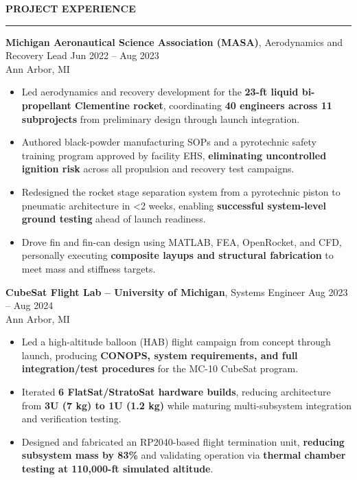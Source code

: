\documentclass[10pt]{article}
\newcommand{\ressection}[1]{
  \vspace{0.12em}
  {\large\bfseries #1}\par
  \vspace{0.05em}\hrule\vspace{0.12em}
}
\begin{document}
\ressection{PROJECT EXPERIENCE}

{\bfseries Michigan Aeronautical Science Association (MASA)}, Aerodynamics and Recovery Lead \hfill Jun 2022 -- Aug 2023 \\
Ann Arbor, MI
\begin{itemize}
  \item Led aerodynamics and recovery development for the \textbf{23-ft liquid bi-propellant Clementine rocket}, coordinating \textbf{40 engineers across 11 subprojects} from preliminary design through launch integration.
  \item Authored black-powder manufacturing SOPs and a pyrotechnic safety training program approved by facility EHS, \textbf{eliminating uncontrolled ignition risk} across all propulsion and recovery test campaigns.
  \item Redesigned the rocket stage separation system from a pyrotechnic piston to pneumatic architecture in <2 weeks, enabling \textbf{successful system-level ground testing} ahead of launch readiness.
  \item Drove fin and fin-can design using MATLAB, FEA, OpenRocket, and CFD, personally executing \textbf{composite layups and structural fabrication} to meet mass and stiffness targets.
\end{itemize}

{\bfseries CubeSat Flight Lab -- University of Michigan}, Systems Engineer \hfill Aug 2023 -- Aug 2024 \\
Ann Arbor, MI
\begin{itemize}
  \item Led a high-altitude balloon (HAB) flight campaign from concept through launch, producing \textbf{CONOPS, system requirements, and full integration/test procedures} for the MC-10 CubeSat program.
  \item Iterated \textbf{6 FlatSat/StratoSat hardware builds}, reducing architecture from \textbf{3U (7 kg) to 1U (1.2 kg)} while maturing multi-subsystem integration and verification testing.
  \item Designed and fabricated an RP2040-based flight termination unit, {\bfseries reducing subsystem mass by 83\%} and validating operation via \textbf{thermal chamber testing at 110,000-ft simulated altitude}.
\end{itemize}
\end{document}
